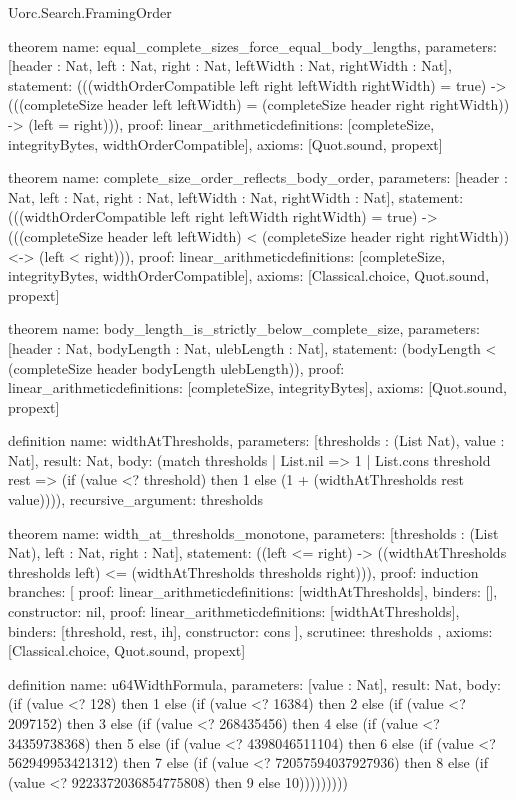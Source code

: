 \begin{lexlean}{Uorc.Search.FramingOrder}
\begin{semanticmodule}
theorem{
  name: equal_complete_sizes_force_equal_body_lengths,
  parameters: [header : Nat, left : Nat, right : Nat, leftWidth : Nat, rightWidth : Nat],
  statement: (((widthOrderCompatible left right leftWidth rightWidth) = true) -> (((completeSize header left leftWidth) = (completeSize header right rightWidth)) -> (left = right))),
  proof: linear_arithmetic{definitions: [completeSize, integrityBytes, widthOrderCompatible]},
  axioms: [Quot.sound, propext]
}

theorem{
  name: complete_size_order_reflects_body_order,
  parameters: [header : Nat, left : Nat, right : Nat, leftWidth : Nat, rightWidth : Nat],
  statement: (((widthOrderCompatible left right leftWidth rightWidth) = true) -> (((completeSize header left leftWidth) < (completeSize header right rightWidth)) <-> (left < right))),
  proof: linear_arithmetic{definitions: [completeSize, integrityBytes, widthOrderCompatible]},
  axioms: [Classical.choice, Quot.sound, propext]
}

theorem{
  name: body_length_is_strictly_below_complete_size,
  parameters: [header : Nat, bodyLength : Nat, ulebLength : Nat],
  statement: (bodyLength < (completeSize header bodyLength ulebLength)),
  proof: linear_arithmetic{definitions: [completeSize, integrityBytes]},
  axioms: [Quot.sound, propext]
}

definition{
  name: widthAtThresholds,
  parameters: [thresholds : (List Nat), value : Nat],
  result: Nat,
  body: (match thresholds
    | List.nil => 1
    | List.cons threshold rest => (if (value <? threshold) then 1 else (1 + (widthAtThresholds rest value)))),
  recursive_argument: thresholds
}

theorem{
  name: width_at_thresholds_monotone,
  parameters: [thresholds : (List Nat), left : Nat, right : Nat],
  statement: ((left <= right) -> ((widthAtThresholds thresholds left) <= (widthAtThresholds thresholds right))),
  proof: induction{
    branches: [
      {proof: linear_arithmetic{definitions: [widthAtThresholds]}, binders: [], constructor: nil},
      {
        proof: linear_arithmetic{definitions: [widthAtThresholds]},
        binders: [threshold, rest, ih],
        constructor: cons
      }
    ],
    scrutinee: thresholds
  },
  axioms: [Classical.choice, Quot.sound, propext]
}

definition{
  name: u64WidthFormula,
  parameters: [value : Nat],
  result: Nat,
  body: (if (value <? 128) then 1 else (if (value <? 16384) then 2 else (if (value <? 2097152) then 3 else (if (value <? 268435456) then 4 else (if (value <? 34359738368) then 5 else (if (value <? 4398046511104) then 6 else (if (value <? 562949953421312) then 7 else (if (value <? 72057594037927936) then 8 else (if (value <? 9223372036854775808) then 9 else 10)))))))))
}


\end{semanticmodule}
\end{lexlean}
